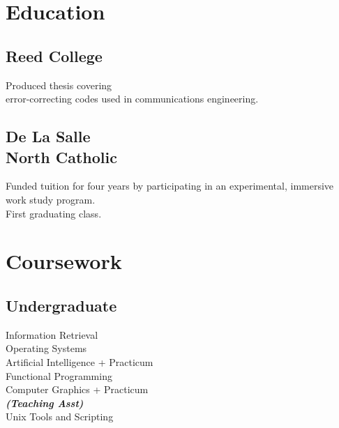 \documentclass[]{deemweaver}
\begin{document}
\begin{minipage}[t]{0.33\textwidth}
\section{Education} 

\subsection{Reed College}
Produced thesis covering \\ error-correcting codes used in communications engineering.
\sectionsep

\subsection{De La Salle \protect\\ North Catholic}
Funded tuition for four years by participating in an experimental,
immersive work study program. \\First graduating class.
\sectionsep

\section{Coursework}

\subsection{Undergraduate}
Information Retrieval \\
Operating Systems \\
Artificial Intelligence + Practicum \\
Functional Programming \\
Computer Graphics + Practicum \\
{\footnotesize \textit{\textbf{(Teaching Asst)}}} \\
Unix Tools and Scripting \\

%
%

\end{minipage} 
\hfill
\end{document}
